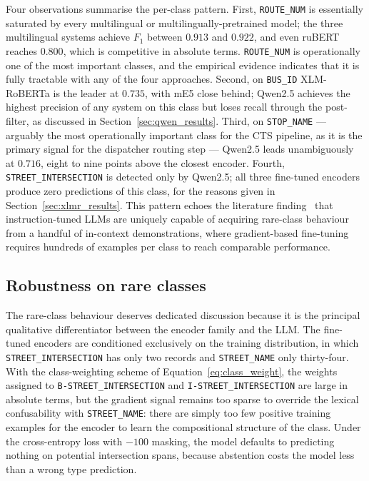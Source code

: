 Four observations summarise the per-class pattern. First, \texttt{ROUTE\_NUM} is essentially saturated by every multilingual or multilingually-pretrained model; the three multilingual systems achieve $F_1$ between $0.913$ and $0.922$, and even ruBERT reaches $0.800$, which is competitive in absolute terms. \texttt{ROUTE\_NUM} is operationally one of the most important classes, and the empirical evidence indicates that it is fully tractable with any of the four approaches. Second, on \texttt{BUS\_ID} XLM-RoBERTa is the leader at $0.735$, with mE5 close behind; Qwen2.5 achieves the highest precision of any system on this class but loses recall through the post-filter, as discussed in Section~\ref{sec:qwen_results}. Third, on \texttt{STOP\_NAME} --- arguably the most operationally important class for the CTS pipeline, as it is the primary signal for the dispatcher routing step --- Qwen2.5 leads unambiguously at $0.716$, eight to nine points above the closest encoder. Fourth, \texttt{STREET\_INTERSECTION} is detected only by Qwen2.5; all three fine-tuned encoders produce zero predictions of this class, for the reasons given in Section~\ref{sec:xlmr_results}. This pattern echoes the literature finding~\cite{keraghel2024survey,yang2023survey} that instruction-tuned LLMs are uniquely capable of acquiring rare-class behaviour from a handful of in-context demonstrations, where gradient-based fine-tuning requires hundreds of examples per class to reach comparable performance.

\subsection{Robustness on rare classes}
\label{sec:rare_class_robustness}

The rare-class behaviour deserves dedicated discussion because it is the principal qualitative differentiator between the encoder family and the LLM. The fine-tuned encoders are conditioned exclusively on the training distribution, in which \texttt{STREET\_INTERSECTION} has only two records and \texttt{STREET\_NAME} only thirty-four. With the class-weighting scheme of Equation~\eqref{eq:class_weight}, the weights assigned to \texttt{B-STREET\_INTERSECTION} and \texttt{I-STREET\_INTERSECTION} are large in absolute terms, but the gradient signal remains too sparse to override the lexical confusability with \texttt{STREET\_NAME}: there are simply too few positive training examples for the encoder to learn the compositional structure of the class. Under the cross-entropy loss with $-100$ masking, the model defaults to predicting nothing on potential intersection spans, because abstention costs the model less than a wrong type prediction.

